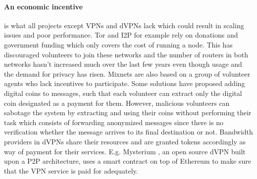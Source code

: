 \paragraph{An economic incentive} is what all projects except VPNs and dVPNs
lack which could result in scaling issues and poor performance. Tor and I2P
for example rely on donations and government funding which only covers the cost
of running a node. This has discouraged volunteers to join these networks and the
number of routers in both networks hasn't increased much over the last few years
even though usage and the demand for privacy has risen.
Mixnets are also based on a group of volunteer agents who lack incentives to
participate. Some solutions have proposed adding digital coins to messages, such
that each volunteer can extract only the digital coin designated as a payment
for them. However, malicious volunteers can sabotage the system by extracting
and using their coins without performing their task which consists of forwarding
anonymized messages since there is no verification whether the message arrives
to its final destination or not. Bandwidth providers in dVPNs share their
resources and are granted tokens accordingly as way of payment for their
services. E.g. Mysterium \cite{mysterium}, an open source dVPN built upon a P2P
architecture, uses a smart contract on top of Ethereum to make sure
that the VPN service is paid for adequately.

